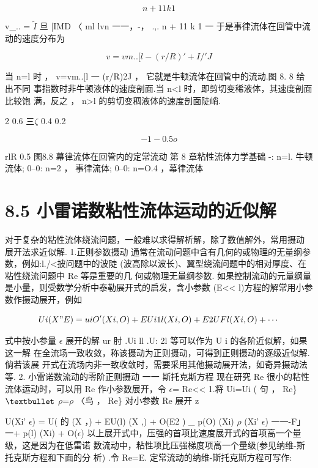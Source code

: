 \[n + 11 k 1\]

v\_.. = $\tilde{I}$ 旦 |IMD 〈 ml lvn 一一，-， .,. n + 11 k 1 一 于是事律流体在回管中流动的速度分布为

\begin{equation*}v = vm.. [l- (r/R)' +I/'J\tag{8.62}\end{equation*}

当 n=l 时 ， v=vm..[l 一 (r/R)2J ， 它就是牛顿流体在回管中的流动.图 8. 8 给出不同 事指数时非牛顿液体的速度剖面.当 n<l 时，即剪切变稀液体，其速度剖面比较饱 满，反之 ， n>l 的剪切变稠液体的速度剖面陡峭.

2 0.6 三$\zeta$ 0.4 0.2

\[-1 -0.5 o\]

rlR 0.5 图8.8 幕律流体在回管内的定常流动 第 8 章粘性流体力学基础 -: n=l. 牛顿流体; 0--0: n=2 ， 事律流体; 0--0: n=O.4 ，幕律流体

\section*{8.5  小雷诺数粘性流体运动的近似解}

对于复杂的粘性流体绕流问题，一般难以求得解析解，除了数值解外，常用摄动 展开法求近似解. 1.正则参数摄动 通常在流动问题中含有几何的或物理的无量纲参数，例如:l./<披问题中的波陡 (波高除以波长)、翼型绕流问题中的相对厚度、在粘性绕流问题中 Re 等是重要的几 何或物理无量纲参数. 如果控制流动的元量纲量是小量，则受数学分析中泰勒展开式的启发，含小参数 (E<< l)方程的解常用小参数作摄动展开，例如

\[Ui (X" E) = uiO' (Xi ,O) + EUi 1l (Xi , O) + E 2 UFl (Xi , O) +\cdots \]

式中按小参量 $\epsilon$ 展开的解 ur 肘 .Ui ll .U: 2l 等可以作为 U i 的各阶近似解，如果这一解 在全流场一致收敛，称该摄动为正则摄动，可得到正则摄动的逐级近似解.倘若该展 开式在流场内非一致收敛时，需要采用其他摄动展开法，如奇异摄动法等. 2. 小雷诺数流动的零阶正则摄动 一一 斯托克斯方程 现在研究 Re 很小的粘性流体运动时，可以用 Re 作小参数展开，令 $\epsilon$= Re<< 1.将 Ui=Ui ( 句 ， Re\} ${\rm •}$ $\rho$=$\rho$ 〈鸟 ， Re\} 对小参数 Re 展开 z

U(Xi' $\epsilon$) = U( 的 (X ，) + EU(l) (X ,) + O(E2 ) \_ p(O) (Xi) $\rho$ (Xi' $\epsilon$) 一一-F」一+ p(l) (Xi) + O($\epsilon$) 以上展开式中，压强的首项比速度展开式的首项高一个量级，这是因为在低雷诺 数流动中，粘性项比压强梯度项高一个量级(参见纳维-斯托克斯方程和下面的分 析) .令 Re=E. 定常流动的纳维-斯托克斯方程可写作:

